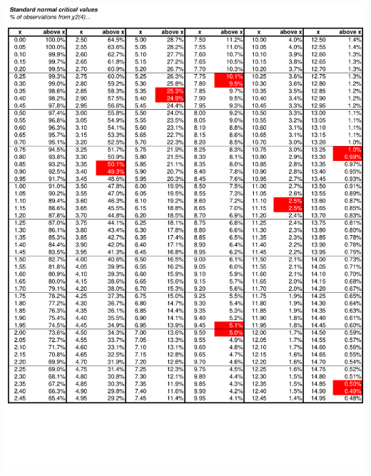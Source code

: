\documentclass[8pt,letterpaper, landscape]{extarticle} %
\begin{document}
\begin{center}
\includegraphics[height=9.75in, angle=90]{cv6}

\end{center}
\end{document}
